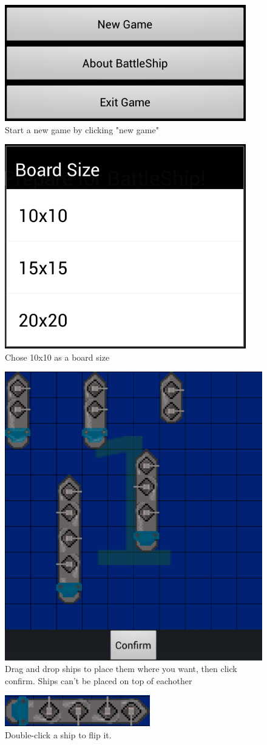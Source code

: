 \documentclass[12pt, a4paper]{article}
\begin{document}
\begin{figure}[h!]
    \centering
    \includegraphics[width=.6\textwidth]{newgame} 
    \caption{Start a new game by clicking "new game"}
    \label{fig:newgame}
\end{figure}

\begin{figure}[h!]
    \centering
    \includegraphics[width=.4\textwidth]{choseboardsize}
    \caption{Chose 10x10 as a board size}
    \label{fig:choseboardsize}
\end{figure}

\begin{figure}[h!]
    \centering
    \includegraphics[width=.4\textwidth]{placeships}
    \caption{Drag and drop ships to place them where you want, then click
confirm. Ships can’t be placed on top of eachother}
    \label{fig:placeships}
\end{figure}

\begin{figure}[h!]
    \centering
    \includegraphics[width=.4\textwidth]{flipships}
    \caption{Double-click a ship to flip it.}
    \label{fig:flipships}
\end{figure}
\end{document}
